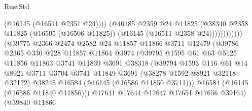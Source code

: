 \begin{lexlean}{RustStd}
\begin{coremodule}
                                              (@16145 (@16511 @2351 @24))))
                                          (@40185
                                            @2359
                                            @24
                                            @11825
                                            (@38340
                                              @2358
                                              @11825
                                              (@16505 (@16506 @11825))
                                              (@16145 (@16511 @2358 @24))))))))))))
                          (@39775
                            @2366
                            @2474
                            @2582
                            @24
                            @11857
                            @11866
                            @3711
                            @12479
                            (@39786
                              @2365
                              @330
                              @228
                              @11857
                              @11864
                              @3974
                              (@39795
                                @1595
                                @61
                                @63
                                @5125
                                @11856
                                @11863
                                @3741
                                @11839
                                @3691
                                @38318
                                (@39794
                                  @1593
                                  @116
                                  @61
                                  @14
                                  @8921
                                  @3711
                                  @3704
                                  @3741
                                  @11849
                                  @3691
                                  (@38278 @1592 @8921 @32118 @32122)
                                  @38245
                                  @16584
                                  (@16145 (@16586 @11850 @3711)))
                                @16584
                                (@16145 (@16586 @11840 @11856)))
                              @17641
                              @17644
                              @17647
                              @17651
                              @17656
                              @39164)
                            (@39840
                              @11866

\end{coremodule}
\end{lexlean}
